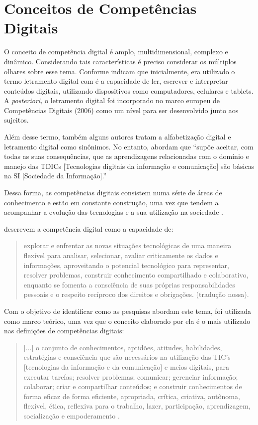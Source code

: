 \documentclass[portuguese]{textolivre}
\begin{document}
\section{Conceitos de Competências Digitais}
O conceito de competência digital é amplo, multidimensional, complexo e
dinâmico. Considerando tais características é preciso considerar os
múltiplos olhares sobre esse tema. Conforme \textcite{silva2019a} indicam
que inicialmente, era utilizado o termo letramento digital com é a
capacidade de ler, escrever e interpretar conteúdos digitais, utilizando
dispositivos como computadores, celulares e tablets. A \emph{posteriori,
}o letramento digital foi incorporado no marco europeu de Competências Digitais (2006) como
um nível para ser desenvolvido junto aos sujeitos.

Além desse termo, também alguns autores tratam a alfabetização digital e
letramento digital como sinônimos. No entanto, \textcite{silva2019a}
abordam que ``supõe aceitar, com todas as suas consequências, que as
aprendizagens relacionadas com o domínio e manejo das TDICs [Tecnologias digitais da informação e comunicação] são básicas
na SI [Sociedade da Informação].'' \cite[s.p.]{silva2019a}

Dessa forma, as competências digitais consistem numa série de áreas de
conhecimento e estão em constante construção, uma vez que tendem a
acompanhar a evolução das tecnologias e a sua utilização na sociedade
\cite{ferrari2013}.

\textcite[p.~186]{calvani2009} descrevem a competência digital
como a capacidade de:
\begin{quote}
explorar e enfrentar as novas situações tecnológicas de uma maneira
flexível para analisar, selecionar, avaliar criticamente os dados e
informações, aproveitando o potencial tecnológico para representar,
resolver problemas, construir conhecimento compartilhado e colaborativo,
enquanto se fomenta a consciência de suas próprias responsabilidades
pessoais e o respeito recíproco dos direitos e obrigações. (tradução
nossa).
\end{quote}

Com o objetivo de identificar como as pesquisas abordam este tema,
\textcite{ferrari2012} foi utilizada como marco teórico, uma vez que o conceito
elaborado por ela é o mais utilizado nas definições de competências
digitais:
\begin{quote}
{[}...{]} o conjunto de conhecimentos, aptidões, atitudes, habilidades,
estratégias e consciência que são necessários na utilização das TIC's
{[}tecnologias da informação e da comunicação{]} e meios digitais, para
executar tarefas; resolver problemas; comunicar; gerenciar informação;
colaborar; criar e compartilhar conteúdos; e construir conhecimentos de
forma eficaz de forma eficiente, apropriada, crítica, criativa,
autônoma, flexível, ética, reflexiva para o trabalho, lazer,
participação, aprendizagem, socialização e empoderamento \cite[p.~3-4, tradução nossa]{ferrari2012}.
\end{quote}
\end{document}

